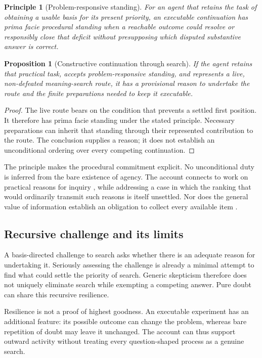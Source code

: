 \documentclass[11pt,a4paper]{article}
\newtheorem{proposition}{Proposition}
\newtheorem{principle}{Principle}
\begin{document}
\begin{principle}[Problem-responsive standing]
For an agent that retains the task of obtaining a usable basis for its present priority, an executable continuation has prima facie procedural standing when a reachable outcome could resolve or responsibly close that deficit without presupposing which disputed substantive answer is correct.
\end{principle}

\begin{proposition}[Constructive continuation through search]
If the agent retains that practical task, accepts problem-responsive standing, and represents a live, non-defeated meaning-search route, it has a provisional reason to undertake the route and the finite preparations needed to keep it executable.
\end{proposition}
\begin{proof}
The live route bears on the condition that prevents a settled first position. It therefore has prima facie standing under the stated principle. Necessary preparations can inherit that standing through their represented contribution to the route. The conclusion supplies a reason; it does not establish an unconditional ordering over every competing continuation.
\end{proof}

The principle makes the procedural commitment explicit. No unconditional duty is inferred from the bare existence of agency. The account connects to work on practical reasons for inquiry \cite{kauppinen2026}, while addressing a case in which the ranking that would ordinarily transmit such reasons is itself unsettled. Nor does the general value of information establish an obligation to collect every available item \cite{bradleysteele2016}.

\subsection{Recursive challenge and its limits}
A basis-directed challenge to search asks whether there is an adequate reason for undertaking it. Seriously assessing the challenge is already a minimal attempt to find what could settle the priority of search. Generic skepticism therefore does not uniquely eliminate search while exempting a competing answer. Pure doubt can share this recursive resilience.

Resilience is not a proof of highest goodness. An executable experiment has an additional feature: its possible outcome can change the problem, whereas bare repetition of doubt may leave it unchanged. The account can thus support outward activity without treating every question-shaped process as a genuine search.
\end{document}
